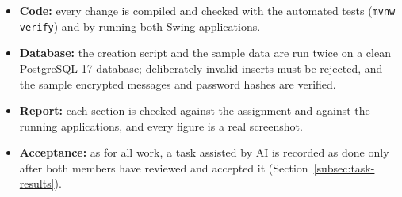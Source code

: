 \begin{itemize}
  \item \textbf{Code:} every change is compiled and checked with the automated
    tests (\texttt{mvnw verify}) and by running both Swing applications.
  \item \textbf{Database:} the creation script and the sample data are run twice
    on a clean PostgreSQL 17 database; deliberately invalid inserts must be
    rejected, and the sample encrypted messages and password hashes are verified.
  \item \textbf{Report:} each section is checked against the assignment and
    against the running applications, and every figure is a real screenshot.
  \item \textbf{Acceptance:} as for all work, a task assisted by AI is recorded
    as done only after both members have reviewed and accepted it
    (Section~\ref{subsec:task-results}).
\end{itemize}
